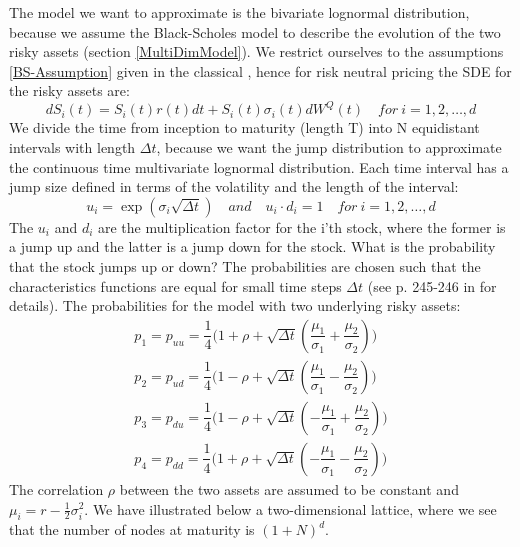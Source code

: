 The model we want to approximate is the bivariate lognormal distribution, because we assume the Black-Scholes model to describe the evolution of the two risky assets (section \ref{MultiDimModel}). We restrict ourselves to the assumptions \ref{BS-Assumption} given in the classical \parencite{B-S-Paper}, hence for risk neutral pricing the SDE for the risky assets are:
$$dS_i(t)=S_i(t)r(t)dt+S_i(t)\sigma_i(t)dW^Q(t) \quad for \ i=1,2,\ldots,d$$
We divide the time from inception to maturity (length T) into N equidistant intervals with length $\Delta t$, because we want the jump distribution to approximate the continuous time multivariate lognormal distribution. Each time interval has a jump size defined in terms of the volatility and the length of the interval:
$$u_i=\exp(\sigma_i \sqrt{\Delta t}) \quad and \quad u_i \cdot d_i = 1 \quad for \ i=1,2,\ldots,d $$
The $u_i$ and $d_i$ are the multiplication factor for the i'th stock, where the former is a jump up and the latter is a jump down for the stock. What is the probability that the stock jumps up or down? The probabilities are chosen such that the characteristics functions are equal for small time steps $\Delta t$ (see p. 245-246 in \parencite{BEG} for details). The probabilities for the model with two underlying risky assets:
\begin{equation}
\begin{split}
p_1=p_{uu}=\dfrac{1}{4}\bigg( 1+\rho + \sqrt{\Delta t}(\dfrac{\mu_1}{\sigma_1} + \dfrac{\mu_2}{\sigma_2}) \bigg)\\
p_2=p_{ud}=\dfrac{1}{4}\bigg( 1-\rho + \sqrt{\Delta t}(\dfrac{\mu_1}{\sigma_1} - \dfrac{\mu_2}{\sigma_2}) \bigg)\\
p_3=p_{du}=\dfrac{1}{4}\bigg( 1-\rho + \sqrt{\Delta t}(-\dfrac{\mu_1}{\sigma_1} + \dfrac{\mu_2}{\sigma_2}) \bigg)\\
p_4=p_{dd}=\dfrac{1}{4}\bigg( 1+\rho + \sqrt{\Delta t}(-\dfrac{\mu_1}{\sigma_1} - \dfrac{\mu_2}{\sigma_2}) \bigg)
\end{split}
\end{equation} 
The correlation $\rho$ between the two assets are assumed to be constant and $\mu_i=r-\frac{1}{2}\sigma_i^2$. We have illustrated below a two-dimensional lattice, where we see that the number of nodes at maturity is $(1+N)^d$. 

